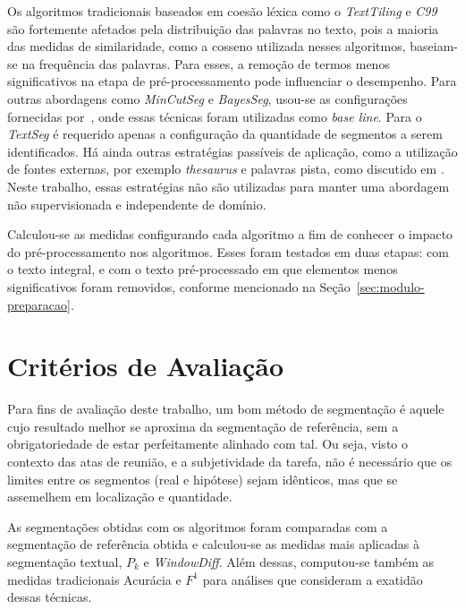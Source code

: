 Os algoritmos tradicionais baseados em coesão léxica como o \textit{TextTiling} e \textit{C99} são fortemente afetados pela distribuição das palavras no texto, pois a maioria das medidas de similaridade, como a cosseno utilizada nesses algoritmos, baseiam-se na frequência das palavras. Para esses, a remoção de termos menos significativos na etapa de pré-processamento pode influenciar o desempenho. Para outras abordagens como \textit{MinCutSeg} e \textit{BayesSeg}, usou-se as configurações fornecidas por~\cite{Eis2008}, onde essas técnicas foram utilizadas como \textit{base line}. Para o \textit{TextSeg} é requerido apenas a configuração da quantidade de segmentos a serem identificados.
Há ainda outras estratégias passíveis de aplicação, como a utilização de fontes externas, por exemplo \textit{thesaurus} e palavras pista, como discutido em \cite{Naili2016, Gutierrez2016, Ferret2009}. Neste trabalho, essas estratégias não são utilizadas para manter uma abordagem não supervisionada e independente de domínio. 

Calculou-se as medidas configurando cada algoritmo
a fim de conhecer o impacto do pré-processamento nos algoritmos. 
Esses foram testados em duas etapas: com o texto integral, e com o texto pré-processado em que elementos menos significativos foram removidos, conforme mencionado na Seção~\ref{sec:modulo-preparacao}.  


\section{Critérios de Avaliação}

Para fins de avaliação deste trabalho, um bom método de segmentação é aquele cujo resultado melhor se aproxima da segmentação de referência, sem a obrigatoriedade de estar perfeitamente alinhado com tal. Ou seja, visto o contexto das atas de reunião, e a subjetividade da tarefa, não é necessário que os limites entre os segmentos (real e hipótese) sejam idênticos, mas que se assemelhem em localização e quantidade.

As segmentações obtidas com os algoritmos foram comparadas com a segmentação de referência obtida e calculou-se as medidas mais aplicadas à segmentação textual, $P_k$ e \textit{WindowDiff}. Além dessas, computou-se também as medidas tradicionais Acurácia e $F^1$ para análises que consideram a exatidão dessas técnicas.
%



